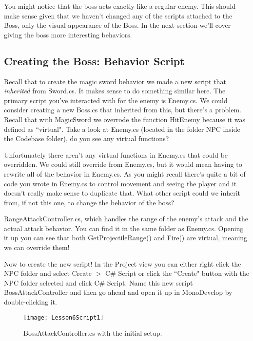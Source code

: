 \documentclass{article}
\begin{document}
\noindent{}

You might notice that the boss acts exactly like a regular enemy. This should make sense given that we haven't changed any of the scripts attached to the Boss, only the visual appearance of the Boss. In the next section we'll cover giving the boss more interesting behaviors. 

\subsection{Creating the Boss: Behavior Script}

Recall that to create the magic sword behavior we made a new script that \textit{inherited} from Sword.cs. It makes sense to do something similar here. The primary script you've interacted with for the enemy is Enemy.cs. We could consider creating a new Boss.cs that inherited from this, but there's a problem. Recall that with MagicSword we overrode the function HitEnemy because it was defined as ``virtual". Take a look at Enemy.cs (located in the folder NPC inside the Codebase folder), do you see any virtual functions?

Unfortunately there aren't any virtual functions in Enemy.cs that could be overridden. We could still override from Enemy.cs, but it would mean having to rewrite all of the behavior in Enemy.cs. As you might recall there's quite a bit of code you wrote in Enemy.cs to control movement and seeing the player and it doesn't really make sense to duplicate that. What other script could we inherit from, if not this one, to change the behavior of the boss? 

RangeAttackController.cs, which handles the range of the enemy's attack and the actual attack behavior. You can find it in the same folder as Enemy.cs. Opening it up you can see that both GetProjectileRange() and Fire() are virtual, meaning we can override them!

Now to create the new script! In the Project view you can either right click the NPC folder and select Create $>$ C\# Script or click the ``Create" button with the NPC folder selected and click C\# Script. Name this new script BossAttackController and then go ahead and open it up in MonoDevelop by double-clicking it. 

\begin{figure}
  \texttt{[image: Lesson6Script1]}
  \caption{BossAttackController.cs with the initial setup.}
  \label{fig:Lesson6Script1}
\end{figure}
\end{document}
